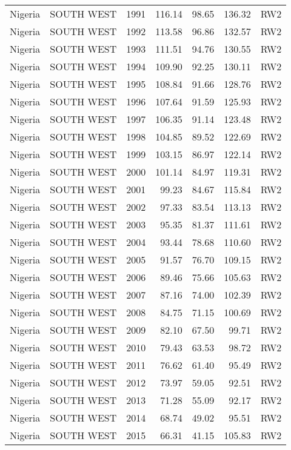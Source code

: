 \begin{longtable}{lllrrrl}
  Nigeria & SOUTH WEST & 1991 & 116.14 & 98.65 & 136.32 & RW2 \\ 
  Nigeria & SOUTH WEST & 1992 & 113.58 & 96.86 & 132.57 & RW2 \\ 
  Nigeria & SOUTH WEST & 1993 & 111.51 & 94.76 & 130.55 & RW2 \\ 
  Nigeria & SOUTH WEST & 1994 & 109.90 & 92.25 & 130.11 & RW2 \\ 
  Nigeria & SOUTH WEST & 1995 & 108.84 & 91.66 & 128.76 & RW2 \\ 
  Nigeria & SOUTH WEST & 1996 & 107.64 & 91.59 & 125.93 & RW2 \\ 
  Nigeria & SOUTH WEST & 1997 & 106.35 & 91.14 & 123.48 & RW2 \\ 
  Nigeria & SOUTH WEST & 1998 & 104.85 & 89.52 & 122.69 & RW2 \\ 
  Nigeria & SOUTH WEST & 1999 & 103.15 & 86.97 & 122.14 & RW2 \\ 
  Nigeria & SOUTH WEST & 2000 & 101.14 & 84.97 & 119.31 & RW2 \\ 
  Nigeria & SOUTH WEST & 2001 & 99.23 & 84.67 & 115.84 & RW2 \\ 
  Nigeria & SOUTH WEST & 2002 & 97.33 & 83.54 & 113.13 & RW2 \\ 
  Nigeria & SOUTH WEST & 2003 & 95.35 & 81.37 & 111.61 & RW2 \\ 
  Nigeria & SOUTH WEST & 2004 & 93.44 & 78.68 & 110.60 & RW2 \\ 
  Nigeria & SOUTH WEST & 2005 & 91.57 & 76.70 & 109.15 & RW2 \\ 
  Nigeria & SOUTH WEST & 2006 & 89.46 & 75.66 & 105.63 & RW2 \\ 
  Nigeria & SOUTH WEST & 2007 & 87.16 & 74.00 & 102.39 & RW2 \\ 
  Nigeria & SOUTH WEST & 2008 & 84.75 & 71.15 & 100.69 & RW2 \\ 
  Nigeria & SOUTH WEST & 2009 & 82.10 & 67.50 & 99.71 & RW2 \\ 
  Nigeria & SOUTH WEST & 2010 & 79.43 & 63.53 & 98.72 & RW2 \\ 
  Nigeria & SOUTH WEST & 2011 & 76.62 & 61.40 & 95.49 & RW2 \\ 
  Nigeria & SOUTH WEST & 2012 & 73.97 & 59.05 & 92.51 & RW2 \\ 
  Nigeria & SOUTH WEST & 2013 & 71.28 & 55.09 & 92.17 & RW2 \\ 
  Nigeria & SOUTH WEST & 2014 & 68.74 & 49.02 & 95.51 & RW2 \\ 
  Nigeria & SOUTH WEST & 2015 & 66.31 & 41.15 & 105.83 & RW2 \\ 

\end{longtable}
